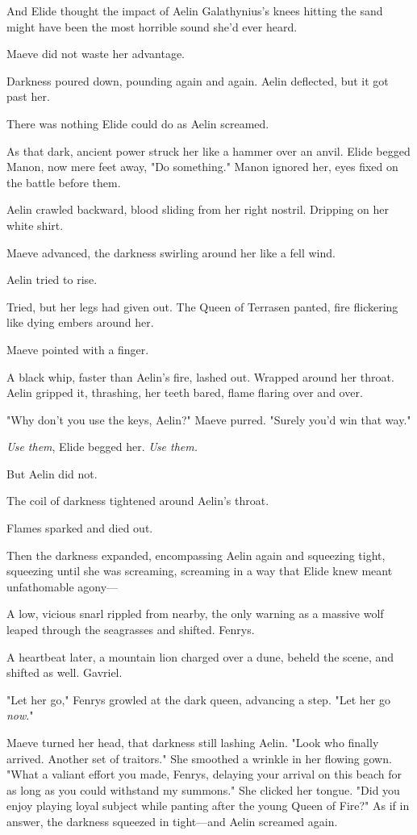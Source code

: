 And Elide thought the impact of Aelin Galathynius's knees hitting the sand might have been the most horrible sound she'd ever heard.

Maeve did not waste her advantage.

Darkness poured down, pounding again and again. Aelin deflected, but it got past her.

There was nothing Elide could do as Aelin screamed.

As that dark, ancient power struck her like a hammer over an anvil. Elide begged Manon, now mere feet away, "Do something." Manon ignored her, eyes fixed on the battle before them.

Aelin crawled backward, blood sliding from her right nostril. Dripping on her white shirt.

Maeve advanced, the darkness swirling around her like a fell wind.

Aelin tried to rise.

Tried, but her legs had given out. The Queen of Terrasen panted, fire flickering like dying embers around her.

Maeve pointed with a finger.

A black whip, faster than Aelin's fire, lashed out. Wrapped around her throat. Aelin gripped it, thrashing, her teeth bared, flame flaring over and over.

"Why don't you use the keys, Aelin?" Maeve purred. "Surely you'd win that way."

\emph{Use them}, Elide begged her. \emph{Use them.}

But Aelin did not.

The coil of darkness tightened around Aelin's throat.

Flames sparked and died out.

Then the darkness expanded, encompassing Aelin again and squeezing tight, squeezing until she was screaming, screaming in a way that Elide knew meant unfathomable agony---

A low, vicious snarl rippled from nearby, the only warning as a massive wolf leaped through the seagrasses and shifted. Fenrys.

A heartbeat later, a mountain lion charged over a dune, beheld the scene, and shifted as well. Gavriel.

"Let her go," Fenrys growled at the dark queen, advancing a step. "Let her go \emph{now}."

Maeve turned her head, that darkness still lashing Aelin. "Look who finally arrived. Another set of traitors." She smoothed a wrinkle in her flowing gown. "What a valiant effort you made, Fenrys, delaying your arrival on this beach for as long as you could withstand my summons." She clicked her tongue. "Did you enjoy playing loyal subject while panting after the young Queen of Fire?" As if in answer, the darkness squeezed in tight---and Aelin screamed again.

